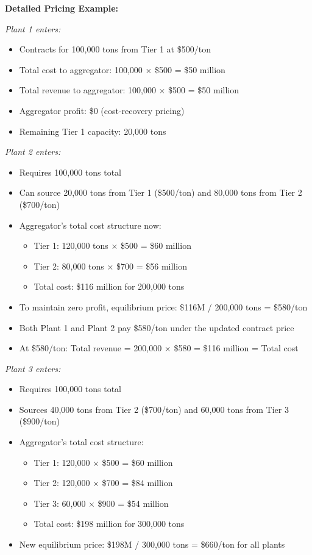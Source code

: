 \documentclass[10.5pt]{article}
\begin{document}
\textbf{Detailed Pricing Example:}

\textit{Plant 1 enters:}
\begin{itemize}
    \item Contracts for 100,000 tons from Tier 1 at \$500/ton
    \item Total cost to aggregator: 100,000 × \$500 = \$50 million
    \item Total revenue to aggregator: 100,000 × \$500 = \$50 million
    \item Aggregator profit: \$0 (cost-recovery pricing)
    \item Remaining Tier 1 capacity: 20,000 tons
\end{itemize}

\textit{Plant 2 enters:}
\begin{itemize}
    \item Requires 100,000 tons total
    \item Can source 20,000 tons from Tier 1 (\$500/ton) and 80,000 tons from Tier 2 (\$700/ton)
    \item Aggregator's total cost structure now:
    \begin{itemize}
        \item Tier 1: 120,000 tons × \$500 = \$60 million
        \item Tier 2: 80,000 tons × \$700 = \$56 million
        \item Total cost: \$116 million for 200,000 tons
    \end{itemize}
    \item To maintain zero profit, equilibrium price: \$116M / 200,000 tons = \$580/ton
    \item Both Plant 1 and Plant 2 pay \$580/ton under the updated contract price
    \item At \$580/ton: Total revenue = 200,000 × \$580 = \$116 million = Total cost
\end{itemize}

\textit{Plant 3 enters:}
\begin{itemize}
    \item Requires 100,000 tons total
    \item Sources 40,000 tons from Tier 2 (\$700/ton) and 60,000 tons from Tier 3 (\$900/ton)
    \item Aggregator's total cost structure:
    \begin{itemize}
        \item Tier 1: 120,000 × \$500 = \$60 million
        \item Tier 2: 120,000 × \$700 = \$84 million
        \item Tier 3: 60,000 × \$900 = \$54 million
        \item Total cost: \$198 million for 300,000 tons
    \end{itemize}
    \item New equilibrium price: \$198M / 300,000 tons = \$660/ton for all plants
\end{itemize}
\end{document}
